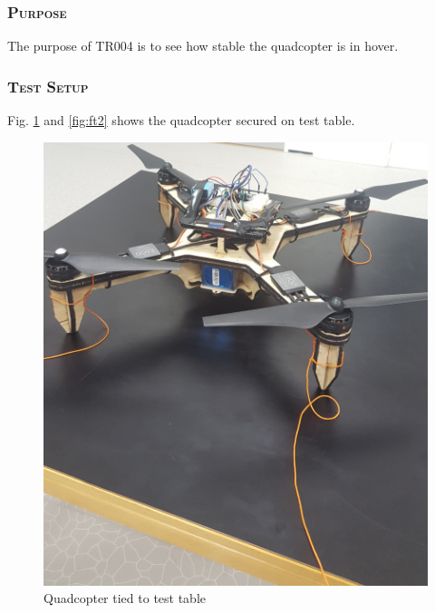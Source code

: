 \subsubsection*{\textsc{\medium Purpose}}
The purpose of TR004 is to see how stable the quadcopter is in hover.

\subsubsection*{\textsc{\medium Test Setup}}
Fig. \ref{fig:ft1} and \ref{fig:ft2} shows the quadcopter secured on test table.

\begin{figure}[h]
        \centering
         \begin{minipage}[b]{0.495\textwidth}
            \includegraphics[width = 1\textwidth]{VAPIQ-PICTURES/flighttest2}
            \caption{Quadcopter tied to test table}
            \label{fig:ft1}
        \end{minipage}
        \hfill
        \begin{minipage}[b]{0.45\textwidth}

\end{minipage}
\end{figure}
